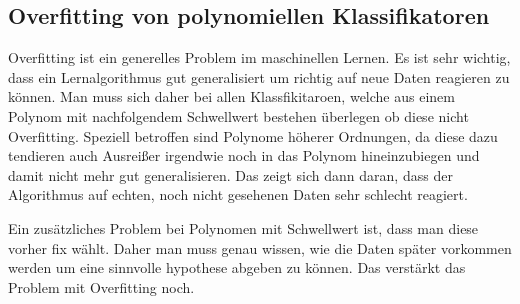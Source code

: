 \subsection{Overfitting von polynomiellen Klassifikatoren}

Overfitting ist ein generelles Problem im maschinellen Lernen. Es ist sehr wichtig, dass ein Lernalgorithmus gut generalisiert um richtig auf neue Daten reagieren zu können. Man muss sich daher bei allen Klassfikitaroen, welche aus einem Polynom mit nachfolgendem Schwellwert bestehen überlegen ob diese nicht Overfitting. Speziell betroffen sind Polynome höherer Ordnungen, da diese dazu tendieren auch Ausreißer irgendwie noch in das Polynom hineinzubiegen und damit nicht mehr gut generalisieren. Das zeigt sich dann daran, dass der Algorithmus auf echten, noch nicht gesehenen Daten sehr schlecht reagiert. 

Ein zusätzliches Problem bei Polynomen mit Schwellwert ist, dass man diese vorher fix wählt. Daher man muss genau wissen, wie die Daten später vorkommen werden um eine sinnvolle hypothese abgeben zu können. Das verstärkt das Problem mit Overfitting noch. 

